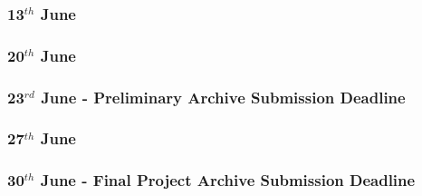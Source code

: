 \subsubsection{13$^{th}$ June}     
\subsubsection{20$^{th}$ June}     
\subsubsection{23$^{rd}$ June - Preliminary Archive Submission Deadline}     
\subsubsection{27$^{th}$ June}     
\subsubsection{30$^{th}$ June - Final Project Archive Submission Deadline}     

